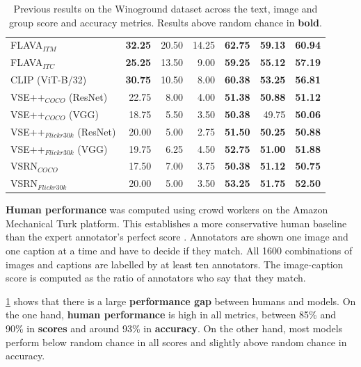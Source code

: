 \begin{table}[ht]
\begin{adjustbox}{max width=0.6\textwidth}
\begin{tabular}{l|rrr|rrr}
 FLAVA$_{ITM}$                & \textbf{32.25} & 20.50          & 14.25          & \textbf{62.75} & \textbf{59.13} & \textbf{60.94} \\
 FLAVA$_{ITC}$        & \textbf{25.25} & 13.50          & 9.00           & \textbf{59.25} & \textbf{55.12} & \textbf{57.19} \\
 CLIP (ViT-B/32)              & \textbf{30.75} & 10.50          & 8.00           & \textbf{60.38} & \textbf{53.25} & \textbf{56.81} \\
 VSE++$_{COCO}$ (ResNet)      & 22.75          & 8.00           & 4.00           & \textbf{51.38} & \textbf{50.88} & \textbf{51.12} \\
 VSE++$_{COCO}$ (VGG)         & 18.75          & 5.50           & 3.50           & \textbf{50.38} & 49.75          & \textbf{50.06} \\
 VSE++$_{Flickr30k}$ (ResNet) & 20.00          & 5.00           & 2.75           & \textbf{51.50} & \textbf{50.25} & \textbf{50.88} \\
 VSE++$_{Flickr30k}$ (VGG)    & 19.75          & 6.25           & 4.50           & \textbf{52.75} & \textbf{51.00} & \textbf{51.88} \\
 VSRN$_{COCO}$                & 17.50          & 7.00           & 3.75           & \textbf{50.38} & \textbf{51.12} & \textbf{50.75} \\
 VSRN$_{Flickr30k}$           & 20.00          & 5.00           & 3.50           & \textbf{53.25} & \textbf{51.75} & \textbf{52.50} \\
\bottomrule
\end{tabular}
\end{adjustbox}
\caption{Previous results on the Winoground dataset across the text, image and group score and accuracy metrics. Results above random chance in \textbf{bold}.}
\label{tab:results_aggr_baseline}
\end{table}

\textbf{Human performance} was computed using crowd workers on the Amazon Mechanical Turk platform. This establishes a more conservative human baseline than the expert annotator's perfect score \cite{thrush2022winoground}. Annotators are shown one image and one caption at a time and have to decide if they match. All 1600 combinations of images and captions are labelled by at least ten annotators. The image-caption score is computed as the ratio of annotators who say that they match.

\cref{tab:results_aggr_baseline} shows that there is a large \textbf{performance gap} between humans and models. On the one hand, \textbf{human performance} is high in all metrics, between 85\% and 90\% in \textbf{scores} and around 93\% in \textbf{accuracy}. On the other hand, most models perform below random chance in all scores and slightly above random chance in accuracy.

